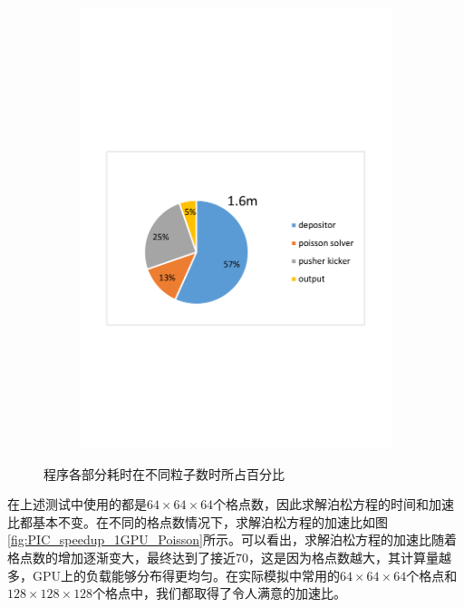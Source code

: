 \begin{figure}[!htb]
\begin{subfigure}[b]{0.75\textwidth}
        \includegraphics[width=\textwidth]{Img/PIC_speedup_1GPU_percentage3.pdf}
    \end{subfigure}
    \caption{程序各部分耗时在不同粒子数时所占百分比}\label{fig:PIC_speedup_1GPU_percentage}
\end{figure}

在上述测试中使用的都是$64 \times 64 \times 64$个格点数，因此求解泊松方程的时间和加速比都基本不变。在不同的格点数情况下，求解泊松方程的加速比如图\ref{fig:PIC_speedup_1GPU_Poisson}所示。可以看出，求解泊松方程的加速比随着格点数的增加逐渐变大，最终达到了接近70，这是因为格点数越大，其计算量越多，GPU上的负载能够分布得更均匀。在实际模拟中常用的$64 \times 64 \times 64$个格点和$128 \times 128 \times 128$个格点中，我们都取得了令人满意的加速比。

